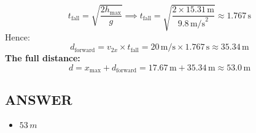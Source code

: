 \[
t_{\text{fall}} = \sqrt{\frac{2 h_{\text{max}}}{g}} \implies
t_{\text{fall}} = \sqrt{\frac{2 \times 15.31\,\text{m}}{9.8\,\text{m/s}^2}} \approx 1.767\,\text{s}
\]
Hence:
\[
d_{\text{forward}} = v_{2x} \times t_{\text{fall}} = 20\,\text{m/s} \times 1.767\,\text{s} \approx 35.34\,\text{m}
\]
\textbf{The full distance:}
\[
d = x_{\text{max}} + d_{\text{forward}} = 17.67\,\text{m} + 35.34\,\text{m} \approx \boxed{53.0\,\text{m}}
\]
 
\vfill \subsection*{ANSWER}
\begin{itemize}
    \item $53 \,m$
\end{itemize}


